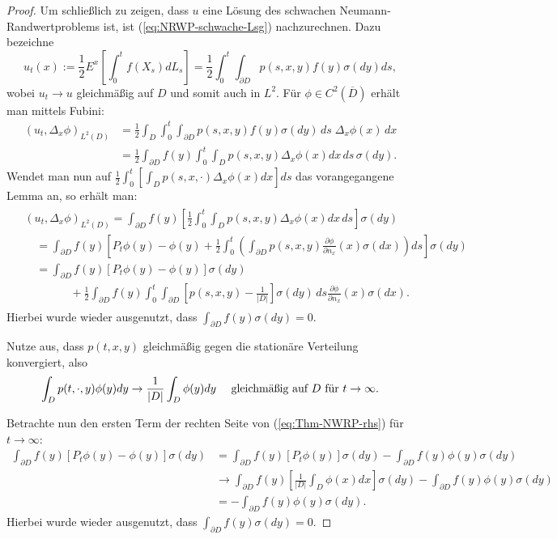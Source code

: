 \documentclass[10pt, a4paper, leqno, twoside, bibliography=totocnumbered, final]{scrartcl}
\theoremstyle{definition}
\theoremstyle{plain}%
\theoremstyle{remark}
\begin{document}
\begin{proof}
Um schließlich zu zeigen, dass $ u $ eine Lösung des schwachen Neumann-Randwertproblems ist, ist (\ref{eq:NRWP-schwache-Lsg}) nachzurechnen. Dazu bezeichne \[ u_t (x) := \frac{1}{2} E^x \left[ \int_0^t f(X_s) dL_s \right] = \frac{1}{2} \int_0^{t} \int_{\partial D} p(s,x,y)  f(y) \sigma(dy) ds, \]wobei $ u_t \to u $ gleichmäßig auf $ D $ und somit auch in $ L^2 $. Für $ \phi \in C^2(\overline{D}) $ erhält man mittels Fubini:
\begin{align*}
\left( u_t , \Delta_x \phi \right)_{L^2(D)} & = \frac{1}{2} \int_D \int_0^{t} \int_{\partial D} p(s,x,y)  f(y) \sigma(dy)\, ds\; \Delta_x \phi (x) \,dx \\
& = \frac{1}{2} \int_{\partial D} f(y) \int_0^{t} \int_D  p(s,x,y) \Delta_x \phi (x) dx \, ds \, \sigma(dy).
\end{align*}
Wendet man nun auf $ \frac{1}{2} \int_0^t \left[ \int_D p(s,x, \cdot ) \Delta_x \phi (x) dx \right] ds $ das vorangegangene Lemma an, so erhält man:
\begin{align}
\begin{split}
\label{eq:Thm-NWRP-rhs}
& \left( u_t , \Delta_x \phi \right)_{L^2(D)} =  \int_{\partial D} f(y) \left[ \frac{1}{2} \int_0^{t}  \int_D  p(s,x,y) \Delta_x \phi (x) dx \, ds \right] \sigma(dy) \\
& \quad = \int_{\partial D} f(y) \left[ P_t \phi(y) - \phi (y) + \frac{1}{2} \int_0^t \left( \int_{\partial D} p(s,x,y )\frac{\partial \phi}{\partial n_x} (x) \sigma (dx)  \right) ds  \right] \sigma(dy) \\
& \quad = \int_{\partial D} f(y) \left[ P_t \phi (y) - \phi (y)  \right] \sigma(dy) \\
& \qquad \qquad + \frac{1}{2} \int_{\partial D} f(y) \int_0^t \int_{\partial D} \left[ p(s,x,y) - \frac{1}{|D|} \right] \sigma(dy) \, ds \frac{\partial \phi}{\partial n_x}(x) \sigma(dx).
\end{split}
\end{align}
Hierbei wurde wieder ausgenutzt, dass $ \int_{\partial D} f(y) \sigma(dy) = 0 $.

Nutze aus, dass $ p(t,x,y) $ gleichmäßig gegen die stationäre Verteilung konvergiert, also
\begin{equation*}
\int_D p(t, \cdot ,y) \phi (y) dy \to \frac{1}{|D|} \int_D \phi (y) dy \quad \text{ gleichmäßig auf $ D $ für } t \to \infty.
\end{equation*}

Betrachte nun den ersten Term der rechten Seite von (\ref{eq:Thm-NWRP-rhs}) für $ t \to \infty $:
\begin{align*}
\int_{\partial D} f(y) \left[ P_t \phi (y) - \phi (y)  \right] \sigma(dy) & = \int_{\partial D} f(y) \left[ P_t \phi (y)\right] \sigma(dy) - \int_{\partial D} f(y) \phi (y) \sigma(dy) \\
& \to \int_{\partial D} f(y) \left[ \frac{1}{|D|} \int_D \phi (x) dx \right] \sigma(dy)  - \int_{\partial D} f(y) \phi (y) \sigma(dy) \\
& = - \int_{\partial D} f(y) \phi (y) \sigma(dy).
\end{align*}
Hierbei wurde wieder ausgenutzt, dass $ \int_{\partial D} f(y) \sigma(dy) = 0 $.


\end{proof}
\end{document}
